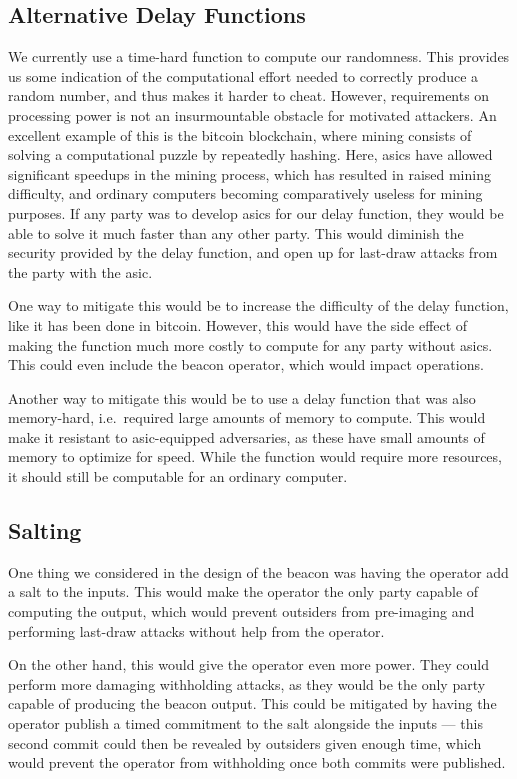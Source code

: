 \subsection{Alternative Delay Functions}
We currently use a time-hard function to compute our randomness.
This provides us some indication of the computational effort needed to correctly produce a random number, and thus makes it harder to cheat.
However, requirements on processing power is not an insurmountable obstacle for motivated attackers.
An excellent example of this is the bitcoin blockchain, where mining consists of solving a computational puzzle by repeatedly hashing.
Here, \glspl{asic} have allowed significant speedups in the mining process, which has resulted in raised mining difficulty, and ordinary computers becoming comparatively useless for mining purposes.
If any party was to develop \glspl{asic} for our delay function, they would be able to solve it much faster than any other party.
This would diminish the security provided by the delay function, and open up for last-draw attacks from the party with the \gls{asic}.

One way to mitigate this would be to increase the difficulty of the delay function, like it has been done in bitcoin.
However, this would have the side effect of making the function much more costly to compute for any party without \glspl{asic}.
This could even include the beacon operator, which would impact operations.

Another way to mitigate this would be to use a delay function that was also memory-hard, i.e.\ required large amounts of memory to compute.
This would make it resistant to \gls{asic}-equipped adversaries, as these have small amounts of memory to optimize for speed.
While the function would require more resources, it should still be computable for an ordinary computer.

\subsection{Salting}
One thing we considered in the design of the beacon was having the operator add a salt to the inputs.
This would make the operator the only party capable of computing the output, which would prevent outsiders from pre-imaging and performing last-draw attacks without help from the operator.

On the other hand, this would give the operator even more power.
They could perform more damaging withholding attacks, as they would be the only party capable of producing the beacon output.
This could be mitigated by having the operator publish a timed commitment to the salt alongside the inputs --- this second commit could then be revealed by outsiders given enough time, which would prevent the operator from withholding once both commits were published.

